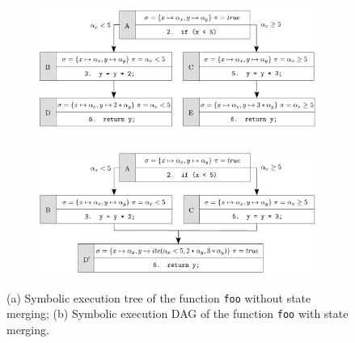 \begin{figure}[t]
  \vspace{-3mm}
  \centering
  \begin{subfigure}{.5\textwidth}
    \centering
    \hspace{-5mm}
    \includegraphics[width=1.05\columnwidth]{images/state-merging} 
    \caption{}
  \end{subfigure}%
  \begin{subfigure}{.5\textwidth}
    \centering
    \includegraphics[width=1.05\columnwidth]{images/state-merging-2} 
    \caption{}
  \end{subfigure}
  \caption{(a) Symbolic execution tree of the function {\tt foo} without state merging; (b) Symbolic execution DAG of the function {\tt foo} with state merging.}
  \label{fig:example-state-merging}
\end{figure}


